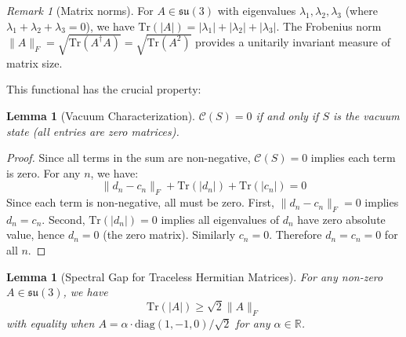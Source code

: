 \documentclass[11pt]{article}
\numberwithin{equation}{section}
\newtheorem{lemma}[theorem]{Lemma}
\theoremstyle{definition}
\theoremstyle{remark}
\newtheorem{remark}[theorem]{Remark}
\begin{document}
\begin{remark}[Matrix norms]
For $A \in \mathfrak{su}(3)$ with eigenvalues $\lambda_1, \lambda_2, \lambda_3$ (where $\lambda_1 + \lambda_2 + \lambda_3 = 0$), we have $\text{Tr}(|A|) = |\lambda_1| + |\lambda_2| + |\lambda_3|$. The Frobenius norm $\|A\|_F = \sqrt{\text{Tr}(A^\dagger A)} = \sqrt{\text{Tr}(A^2)}$ provides a unitarily invariant measure of matrix size.
\end{remark}

This functional has the crucial property:

\begin{lemma}[Vacuum Characterization]
\label{lem:vacuum}
$\mathcal{C}(S) = 0$ if and only if $S$ is the vacuum state (all entries are zero matrices).
\end{lemma}

\begin{proof}
Since all terms in the sum are non-negative, $\mathcal{C}(S) = 0$ implies each term is zero. For any $n$, we have:
\[\|d_n - c_n\|_F + \text{Tr}(|d_n|) + \text{Tr}(|c_n|) = 0\]
Since each term is non-negative, all must be zero. First, $\|d_n - c_n\|_F = 0$ implies $d_n = c_n$. Second, $\text{Tr}(|d_n|) = 0$ implies all eigenvalues of $d_n$ have zero absolute value, hence $d_n = 0$ (the zero matrix). Similarly $c_n = 0$. Therefore $d_n = c_n = 0$ for all $n$.
\end{proof}

\begin{lemma}[Spectral Gap for Traceless Hermitian Matrices]
\label{lem:spectral-gap}
For any non-zero $A \in \mathfrak{su}(3)$, we have
\begin{equation}
\text{Tr}(|A|) \geq \sqrt{2} \|A\|_F
\end{equation}
with equality when $A = \alpha \cdot \text{diag}(1,-1,0)/\sqrt{2}$ for any $\alpha \in \mathbb{R}$.
\end{lemma}
\end{document}
